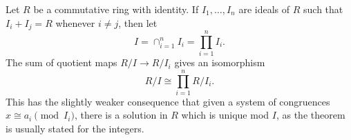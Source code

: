 \documentclass[12pt]{article}
\begin{document}
Let $R$ be a commutative ring with identity.  If $I_1,\ldots,I_n$ are ideals of $R$ such that $I_i + I_j = R$ whenever $i\neq j$, then let $$I=\cap_{i=1}^n I_i = \prod_{i=1}^n I_i.$$ The sum of quotient maps $R/I\to R/I_i$ gives an isomorphism
$$R/I\cong \prod_{i=1}^n {R}/{I_i}.$$  This has the slightly weaker consequence that given a system of congruences $x\cong a_i\pmod{I_i}$, there is a solution in $R$ which is unique mod $I$, as the theorem is usually stated for the integers.
\end{document}
